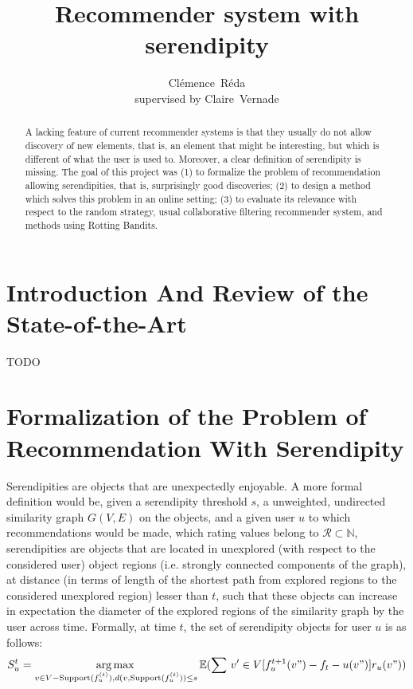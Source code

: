 \documentclass{article}
\title{Recommender system with serendipity}
\author{
  Cl\'{e}mence~R\'{e}da\\
  supervised by Claire~Vernade\\
}
\DeclareMathOperator*{\argmax}{arg\,max\,}
\DeclareMathOperator*{\sumi}{\sum\,}
\begin{document}
\nocite{*}

\maketitle

\begin{abstract}
A lacking feature of current recommender systems is that they usually do not allow discovery of new elements, that is, an element that might be interesting, but which is different of what the user is used to. Moreover, a clear definition of serendipity is missing. The goal of this project was (1) to formalize the problem of recommendation allowing serendipities, that is, surprisingly good discoveries; (2) to design a method which solves this problem in an online setting; (3) to evaluate its relevance with respect to the random strategy, usual collaborative filtering recommender system, and methods using Rotting Bandits.
\end{abstract}

\section{Introduction And Review of the State-of-the-Art}

TODO

\section{Formalization of the Problem of Recommendation With Serendipity}

Serendipities are objects that are unexpectedly enjoyable. A more formal definition would be, given a serendipity threshold $s$, a unweighted, undirected similarity graph $G(V, E)$ on the objects, and a given user $u$ to which recommendations would be made, which rating values belong to $\mathscr{R} \subset \mathbb{N}$, serendipities are objects that are located in unexplored (with respect to the considered user) object regions (i.e. strongly connected components of the graph), at distance (in terms of length of the shortest path from explored regions to the considered unexplored region) lesser than $t$, such that these objects can increase in expectation the diameter of the explored regions of the similarity graph by the user across time. Formally, at time $t$, the set of serendipity objects for user $u$ is as follows:\\

\begin{equation}
\begin{split}
S^{t}_{u} & = \argmax_{v \in V-\text{Support}(f^{(t)}_{u}), d(v, \text{Support}(f^{(t)}_{u})) \leq s} \mathbb{E}(\sumi{v' \in V} [f^{t+1}_{u}(v")-f_{t}-u(v")]r_{u}(v"))\\
\end{split}
\end{equation}
\end{document}
